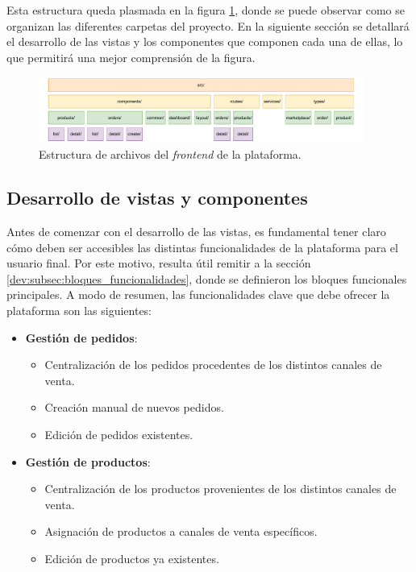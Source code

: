 Esta estructura queda plasmada en la figura \ref{fig:dev:estructura_archivos}, donde se puede observar como se organizan las diferentes carpetas del proyecto. En la siguiente sección se detallará el desarrollo de las vistas y los componentes que componen cada una de ellas, lo que permitirá una mejor comprensión de la figura.

\begin{figure}
    \centering
    \includegraphics[width=0.95\textwidth]{figures/design_develop/estructura_archivos.pdf}
    \caption{Estructura de archivos del \textit{frontend} de la plataforma.}
    \label{fig:dev:estructura_archivos}
\end{figure}

\subsection{Desarrollo de vistas y componentes}
\label{dev:subsec:desarrollo_vistas_componentes}

Antes de comenzar con el desarrollo de las vistas, es fundamental tener claro cómo deben ser accesibles las distintas funcionalidades de la plataforma para el usuario final. Por este motivo, resulta útil remitir a la sección \ref{dev:subsec:bloques_funcionalidades}, donde se definieron los bloques funcionales principales. A modo de resumen, las funcionalidades clave que debe ofrecer la plataforma son las siguientes:

\begin{itemize}
    \item \textbf{Gestión de pedidos}:
          \begin{itemize}
              \item Centralización de los pedidos procedentes de los distintos canales de venta.
              \item Creación manual de nuevos pedidos.
              \item Edición de pedidos existentes.
          \end{itemize}
    \item \textbf{Gestión de productos}:
          \begin{itemize}
              \item Centralización de los productos provenientes de los distintos canales de venta.
              \item Asignación de productos a canales de venta específicos.
              \item Edición de productos ya existentes.
          \end{itemize}
\end{itemize}

